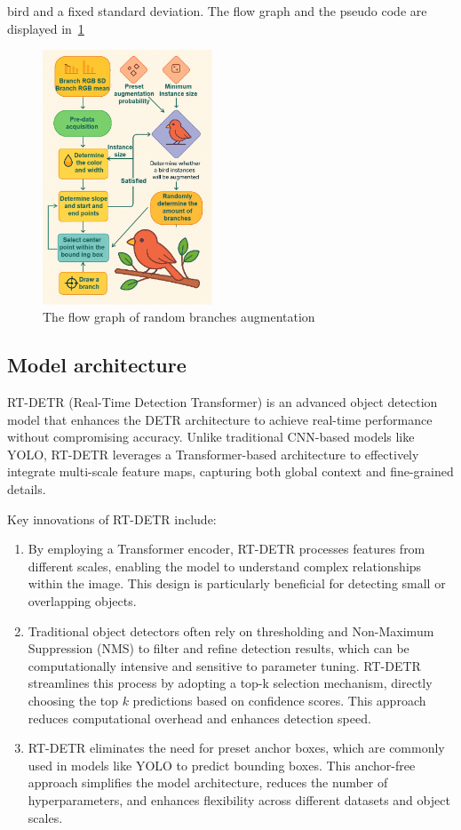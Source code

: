 bird and a fixed standard deviation. The flow graph and the pseudo 
code are displayed in~\ref{png:random-branch}
\begin{figure}[H]
    \includegraphics[width=0.45\textwidth]{images/img1.jpg}
    \caption{The flow graph of random branches augmentation}
    \label{png:random-branch}
\end{figure}
\subsection{Model architecture}
RT-DETR (Real-Time Detection Transformer) is an advanced object detection model that enhances the DETR architecture to achieve real-time performance without compromising accuracy. Unlike traditional CNN-based models like YOLO, RT-DETR leverages a Transformer-based architecture to effectively integrate multi-scale feature maps, capturing both global context and fine-grained details.

Key innovations of RT-DETR include:
\begin{enumerate}
    \item  By employing a Transformer encoder, RT-DETR processes features from different scales, enabling the model to understand complex relationships within the image. This design is particularly beneficial for detecting small or overlapping objects.
    \item  Traditional object detectors often rely on thresholding and Non-Maximum Suppression (NMS) to filter and refine detection results, which can be computationally intensive and sensitive to parameter tuning. RT-DETR streamlines this process by adopting a top-k selection mechanism, directly choosing the top $k$ predictions based on confidence scores. This approach reduces computational overhead and enhances detection speed.
    \item  RT-DETR eliminates the need for preset anchor boxes, which are commonly used in models like YOLO to predict bounding boxes. This anchor-free approach simplifies the model architecture, reduces the number of hyperparameters, and enhances flexibility across different datasets and object scales. 
\end{enumerate}

